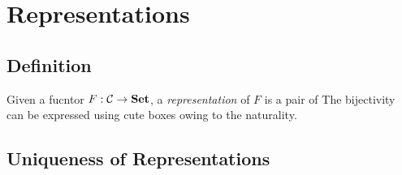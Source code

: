 \section{Representations}

\subsection{Definition}

Given a fucntor $F : \mathcal{C} \to \boldsymbol{\mathrm{Set}}$, a \emph{representation} of $F$ is a pair of 
The bijectivity can be expressed using cute boxes
owing to the naturality.

\subsection{Uniqueness of Representations}

